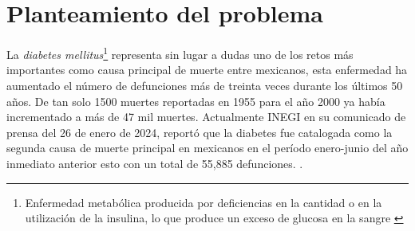


\tableofcontents
\newpage
\listoftables
\newpage
\listoffigures 
 
 
 


\newpage
{}

\section*{Planteamiento del problema}


La \textit{diabetes mellitus}\footnote{Enfermedad metabólica producida por deficiencias en la cantidad o en la utilización de la insulina, lo que produce un exceso de glucosa en la sangre \cite{RAE01} } representa sin lugar a dudas uno de los retos más importantes como causa principal de muerte entre mexicanos, esta enfermedad ha aumentado el número de defunciones más de treinta veces durante los últimos 50 años. De tan solo 1500 muertes reportadas en 1955 para el año 2000 ya había incrementado a más de 47 mil muertes. Actualmente INEGI en su comunicado de prensa del 26 de enero de 2024, reportó que la diabetes fue catalogada como la segunda causa de muerte principal en mexicanos en el período enero-junio del año inmediato anterior esto con un total de 55,885 defunciones. \cite{hernandez2013, inegi2024}.

